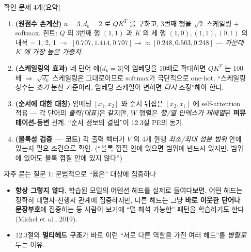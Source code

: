 \documentclass[aspectratio=169,11pt]{beamer}
\begin{document}
\begin{frame}{확인 문제 4개(요약)}
  \begin{enumerate}
    \item \textbf{(원점수 손계산)} $n=3, d_k=2$ 로 $QK^T$ 를
      구하고, 3번째 행을 $\sqrt{2}$ 스케일링 + softmax.
      힌트: $Q$ 의 3번째 행 $(1,1)$ 과 $K$ 의 세 행
      $(1,0),(1,1),(0,1)$ 의 내적 = 1, 2, 1 $\Rightarrow$
      $[0.707, 1.414, 0.707] \to \approx [0.248, 0.503, 0.248]$
      — \emph{가운데 $K$ 에 가장 높은 가중치}.
    \item \textbf{(스케일링의 효과)} 네 단어 예($d_k=3$)의
      임베딩을 10배로 확대하면 $QK^T$ 는 $100$배 $\Rightarrow$
      $\sqrt{d_k}$ 스케일링은 그대로이므로 softmax가 극단적으로
      one-hot. ``스케일링 상수는 \emph{초기} 분산 기준이라,
      임베딩 스케일이 변하면 \emph{다시} 조정''해야 한다.
    \item \textbf{(순서에 대한 대칭)} 임베딩 $[x_1, x_2]$ 와
      순서 뒤집은 $[x_2, x_1]$ 에 self-attention 적용 —
      각 단어의 \emph{출력(대표)}은 같지만, $W$ 행렬은
      \emph{행/열 인덱스가 재배열}된
      \textbf{퍼뮤테이션-등변} 관계. ``순서 정보의 결핍''이
      12.3절 PE의 동기.
    \item \textbf{(볼록성 검증 — 코드)} 각 출력 벡터가 $V$ 의
      4개 원행 \emph{최소/최대 성분 범위} 안에 있는지 필요
      조건으로 확인. (``볼록 껍질 안에 있으면 범위에 반드시
      있지만, 범위에 있어도 볼록 껍질 안에 있지 않다'')
  \end{enumerate}
\end{frame}

\begin{frame}{자주 묻는 질문 1: 문법적으로 ``옳은'' 대상에 집중하나}
  \begin{itemize}
    \item \textbf{항상 그렇지 않다.} 학습된 모델의 어텐션 헤드를
      실제로 들여다보면, 어떤 헤드는 정확히 대명사-선행사 관계에
      집중하지만, 다른 헤드는 그냥 \textbf{바로 이웃한 단어나
      문장부호}에 집중하는 등 사람이 보기에 ``덜 해석 가능한''
      패턴을 학습하기도 한다 (Michel et al., 2019).
    \item 12.3절의 \textbf{멀티헤드 구조}가 바로 이런
      ``서로 다른 역할을 가진 여러 헤드''를 \emph{병렬로} 두는
      이유.
  \end{itemize}
\end{frame}
\end{document}
